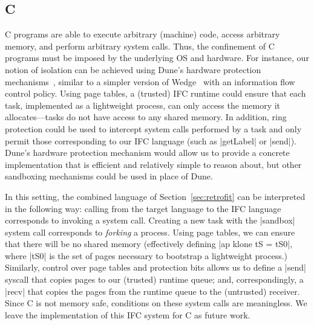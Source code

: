 \subsection{C}
\label{sec:real:c}
%
C programs are able to execute arbitrary (machine) code, access
arbitrary memory, and perform arbitrary system calls.
%
Thus, the confinement of C programs must be imposed by the underlying OS
and hardware.
%
For instance, our notion of isolation can be achieved using Dune's
hardware protection mechanisms~\cite{Belay:2012:DSU:2387880.2387913},
similar to a simpler version of
Wedge~\cite{Belay:2012:DSU:2387880.2387913,
Bittau:2008:WSA:1387589.1387611} with an information flow control
policy.
%
Using page tables, a (trusted) IFC runtime could ensure that each task,
implemented as a lightweight process, can only access the memory it
allocates---tasks do not have access to any shared memory.
%
In addition, ring protection could be used to intercept system
calls performed by
a task and only permit those corresponding to our IFC language (such as
|getLabel| or |send|).
%
Dune's hardware protection mechanism would allow us to provide a concrete
implementation that is efficient and relatively simple to reason
about, but other sandboxing mechanisms could be used in place of Dune.

In this setting, the combined language of Section~\ref{sec:retrofit}
can be interpreted in the following way: calling from the target
language to the IFC language corresponds to invoking a system call.
%
Creating a new task with the |sandbox| system call corresponds to
\emph{forking} a process.  Using page tables, we can ensure that
there will be no shared memory
(effectively
defining |ap klone tS
= tS0|, where |tS0| is the set of pages necessary to bootstrap a
lightweight process.)
%
Similarly, control over page tables and protection bits allows us to
define a |send| syscall that copies pages to our
(trusted) runtime queue; and, correspondingly, a |recv| that copies
the pages from the runtime queue to the (untrusted) receiver.
%
Since C is not memory safe, conditions on these system calls are
meaningless.
%
We leave the implementation of this IFC system for C as future work.
